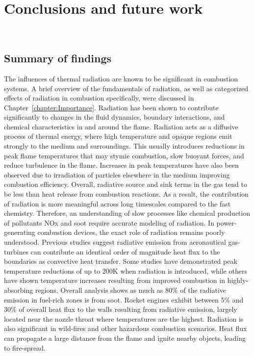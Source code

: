 \addchapheadtotoc
\chapter{Conclusions and future work}~\label{chapter:conclusion}

\section{Summary of findings}
The influences of thermal radiation are known to be significant in combustion systems. A brief overview of the fundamentals of radiation, as well as categorized effects of radiation in combustion specifically, were discussed in Chapter~\ref{chapter:Importance}. 
Radiation has been shown to contribute significantly to changes in the fluid dynamics, boundary interactions, and chemical characteristics in and around the flame. Radiation acts as a diffusive process of thermal energy, where high temperature and opaque regions emit strongly to the medium and surroundings. 
This usually introduces reductions in peak flame temperatures that may stymie combustion, slow buoyant forces, and reduce turbulence in the flame. Increases in peak temperatures have also been observed due to irradiation of particles elsewhere in the medium improving combustion efficiency.
Overall, radiative source and sink terms in the gas tend to be less than heat release from combustion reactions. As a result, the contribution of radiation is more meaningful across long timescales compared to the fast chemistry. Therefore, an understanding of slow processes like chemical production of pollutants NOx and soot require accurate modeling of radiation.
In power-generating combustion devices, the exact role of radiation remains poorly understood. Previous studies suggest radiative emission from aeronautical gas-turbines can contribute an identical order of magnitude heat flux to the boundaries as convective heat transfer. Some studies have demonstrated peak temperature reductions of up to 200K when radiation is introduced, while others have shown temperature increases resulting from improved combustion in highly-absorbing regions. Overall analysis shows as much as 80\% of the radiative emission in fuel-rich zones is from soot. Rocket engines exhibit between 5\% and 30\% of overall heat flux to the walls resulting from radiative emission, largely located near the nozzle throat where temperatures are the highest.
Radiation is also significant in wild-fires and other hazardous combustion scenarios. Heat flux can propagate a large distance from the flame and ignite nearby objects, leading to fire-spread.

